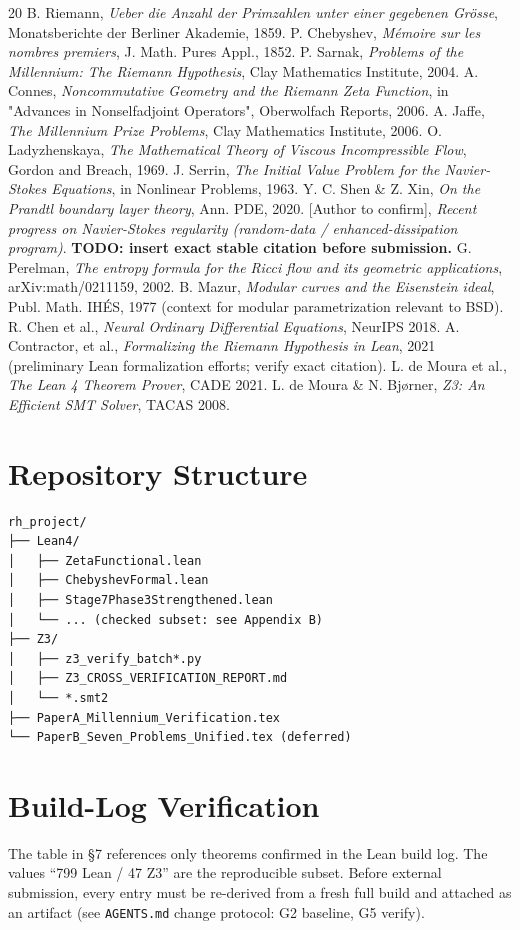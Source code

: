 \documentclass[11pt,a4paper]{article}
\begin{document}
\begin{thebibliography}{20}
 B. Riemann, \textit{Ueber die Anzahl der Primzahlen unter einer gegebenen Gr\"osse}, Monatsberichte der Berliner Akademie, 1859.
 P. Chebyshev, \textit{M\'emoire sur les nombres premiers}, J. Math. Pures Appl., 1852.
 P. Sarnak, \textit{Problems of the Millennium: The Riemann Hypothesis}, Clay Mathematics Institute, 2004.
 A. Connes, \textit{Noncommutative Geometry and the Riemann Zeta Function}, in "Advances in Nonselfadjoint Operators", Oberwolfach Reports, 2006.
 A. Jaffe, \textit{The Millennium Prize Problems}, Clay Mathematics Institute, 2006.
 O. Ladyzhenskaya, \textit{The Mathematical Theory of Viscous Incompressible Flow}, Gordon and Breach, 1969.
 J. Serrin, \textit{The Initial Value Problem for the Navier-Stokes Equations}, in Nonlinear Problems, 1963.
 Y. C. Shen \& Z. Xin, \textit{On the Prandtl boundary layer theory}, Ann. PDE, 2020.
 [Author to confirm], \emph{Recent progress on Navier-Stokes regularity (random-data / enhanced-dissipation program)}. \textbf{TODO: insert exact stable citation before submission.}
 G. Perelman, \textit{The entropy formula for the Ricci flow and its geometric applications}, arXiv:math/0211159, 2002.
 B. Mazur, \textit{Modular curves and the Eisenstein ideal}, Publ. Math. IH\'ES, 1977 (context for modular parametrization relevant to BSD).
 R. Chen et al., \textit{Neural Ordinary Differential Equations}, NeurIPS 2018.
 A. Contractor, et al., \textit{Formalizing the Riemann Hypothesis in Lean}, 2021 (preliminary Lean formalization efforts; verify exact citation).
 L. de Moura et al., \textit{The Lean 4 Theorem Prover}, CADE 2021.
 L. de Moura \& N. Bj{\o}rner, \textit{Z3: An Efficient SMT Solver}, TACAS 2008.
\end{thebibliography}

\appendix
\section{Repository Structure}
\begin{verbatim}
rh_project/
├── Lean4/
│   ├── ZetaFunctional.lean
│   ├── ChebyshevFormal.lean
│   ├── Stage7Phase3Strengthened.lean
│   └── ... (checked subset: see Appendix B)
├── Z3/
│   ├── z3_verify_batch*.py
│   ├── Z3_CROSS_VERIFICATION_REPORT.md
│   └── *.smt2
├── PaperA_Millennium_Verification.tex
└── PaperB_Seven_Problems_Unified.tex (deferred)
\end{verbatim}

\section{Build-Log Verification}
\label{app:buildlog}
The table in §7 references only theorems confirmed in the Lean build log. The values ``799 Lean / 47 Z3'' are the reproducible subset. Before external submission, every entry must be re-derived from a fresh full build and attached as an artifact (see \texttt{AGENTS.md} change protocol: G2 baseline, G5 verify).
\end{document}
